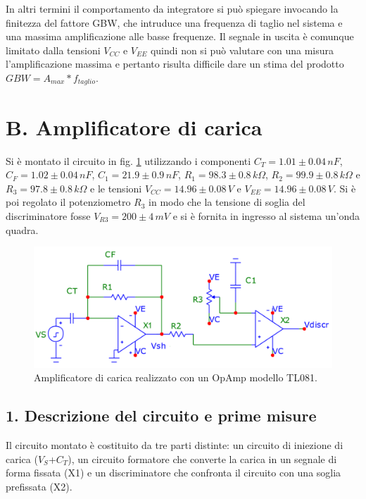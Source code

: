 \documentclass[10pt,a4paper]{article}
\begin{document}
In altri termini il comportamento da integratore si può spiegare invocando la finitezza del fattore GBW, che intruduce una frequenza di taglio nel sistema e una massima amplificazione alle basse frequenze. Il segnale in uscita è comunque limitato dalla tensioni $V_{CC}$ e $V_{EE}$ quindi non si può valutare con una misura l'amplificazione massima e pertanto risulta difficile dare un stima del prodotto $GBW = A_{max} * f_{taglio}$.

\section*{B. Amplificatore di carica}

Si è montato il circuito in fig. \ref{circuito2} utilizzando i componenti $C_T = 1.01\pm0.04 \, nF$, $C_F = 1.02 \pm 0.04 \, nF$, $C_1 = 21.9 \pm 0.9 \, nF$, $R_1 = 98.3 \pm 0.8 \, k \Omega$, $R_2 = 99.9 \pm 0.8 \, k\Omega$ e $R_3 = 97.8 \pm 0.8 \, k \Omega$ e le tensioni $V_{CC} = 14.96\pm0.08 \, V$ e $V_{EE} = 14.96 \pm 0.08 \, V$. Si è poi regolato il potenziometro $R_3$ in modo che la tensione di soglia del discriminatore fosse $V_{R3} = 200 \pm 4 \, mV$ e si è fornita in ingresso al sistema un'onda quadra.\\

\begin{figure}[htb!]
\centering
\includegraphics[scale=0.5]{amplificatoreCarica.png}
\caption{Amplificatore di carica realizzato con un OpAmp modello TL081.\label{circuito2}}
\end{figure}

\subsection*{1. Descrizione del circuito e prime misure}
Il circuito montato è costituito da tre parti distinte: un circuito di iniezione di carica ($V_S$+$C_T$), un circuito formatore che converte la carica in un segnale di forma fissata (X1) e un discriminatore che confronta il circuito con una soglia prefissata (X2).
\end{document}
